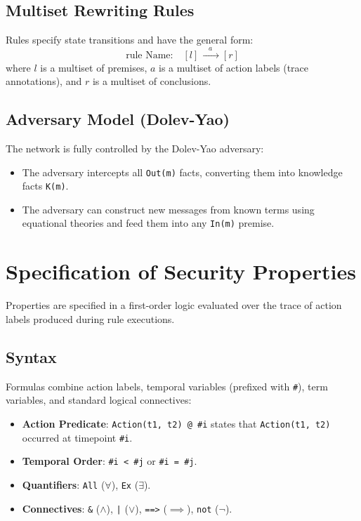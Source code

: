 \documentclass[11pt,a4paper]{article}
\begin{document}
\subsection{Multiset Rewriting Rules}
Rules specify state transitions and have the general form:
\[
\text{rule Name:} \quad [l] \xrightarrow{\quad a \quad} [r]
\]
where $l$ is a multiset of premises, $a$ is a multiset of action labels (trace annotations), and $r$ is a multiset of conclusions.


\subsection{Adversary Model (Dolev-Yao)}
The network is fully controlled by the Dolev-Yao adversary:
\begin{itemize}
    \item The adversary intercepts all \texttt{Out(m)} facts, converting them into knowledge facts \texttt{K(m)}.
    \item The adversary can construct new messages from known terms using equational theories and feed them into any \texttt{In(m)} premise.
\end{itemize}


\section{Specification of Security Properties}

Properties are specified in a first-order logic evaluated over the trace of action labels produced during rule executions.

\subsection{Syntax}
Formulas combine action labels, temporal variables (prefixed with \texttt{\#}), term variables, and standard logical connectives:
\begin{itemize}
    \item \textbf{Action Predicate}: \texttt{Action(t1, t2) @ \#i} states that \texttt{Action(t1, t2)} occurred at timepoint \texttt{\#i}.
    \item \textbf{Temporal Order}: \texttt{\#i < \#j} or \texttt{\#i = \#j}.
    \item \textbf{Quantifiers}: \texttt{All} ($\forall$), \texttt{Ex} ($\exists$).
    \item \textbf{Connectives}: \texttt{\&} ($\land$), \texttt{|} ($\lor$), \texttt{==>} ($\implies$), \texttt{not} ($\neg$).
\end{itemize}
\end{document}
